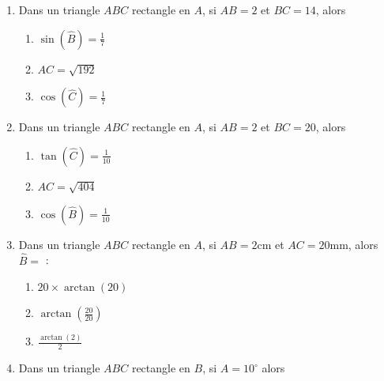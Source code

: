 \documentclass[oneside,twoside]{book}
\begin{document}
\begin{enumerate}
\item Dans un triangle $ABC$ rectangle en $A$, si $AB=2$ et $BC=14$, alors

\begin{enumerate}

\item\MauvaiseReponse $\sin (\hat{B})=\frac{1}{7}$

\item\BonneReponse $AC=\sqrt{192}$

\item\MauvaiseReponse $\cos (\hat{C})=\frac{1}{7}$

\end{enumerate}



\item Dans un triangle $ABC$ rectangle en $A$, si $AB=2$ et $BC=20$, alors

\begin{enumerate}

\item\MauvaiseReponse $\tan (\hat{C})=\frac{1}{10}$

\item\MauvaiseReponse $AC=\sqrt{404}$

\item\BonneReponse $\cos (\hat{B})=\frac{1}{10}$

\end{enumerate}



\item Dans un triangle $ABC$ rectangle en $A$, si $AB=2\mathrm{cm}$ et $AC=20\mathrm{mm}$, alors $\hat{B}=$ :

\begin{enumerate}

\item\MauvaiseReponse $20\times\arctan\left(20\right)$

\item\BonneReponse $\arctan\left(\frac{20}{20}\right)$

\item\MauvaiseReponse $\frac{\arctan\left(2\right)}{2}$

\end{enumerate}


\item Dans un triangle $ABC$ rectangle en $B$, si $\widehat{A}=10^{\circ}$ alors

\begin{enumerate}


\end{enumerate}
\end{enumerate}
\end{document}
